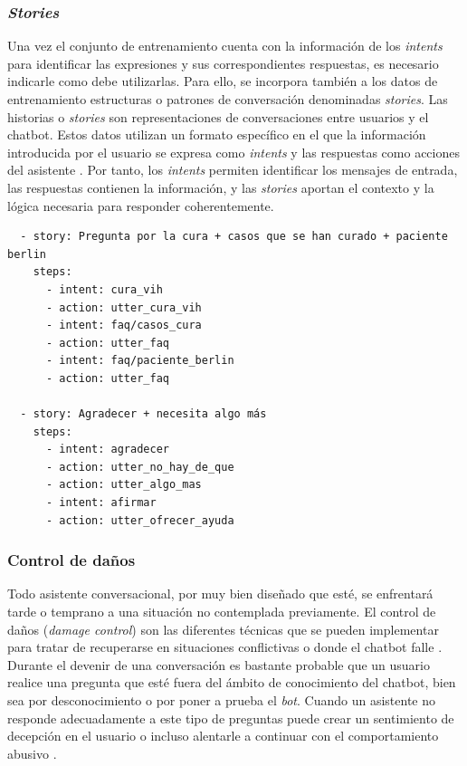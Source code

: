 \subsubsection{\textit{Stories}}
Una vez el conjunto de entrenamiento cuenta con la información de los \textit{intents} para identificar las expresiones y sus correspondientes respuestas, es necesario indicarle como debe utilizarlas. Para ello, se incorpora también a los datos de entrenamiento estructuras o patrones de conversación denominadas \textit{stories}. Las historias o \textit{stories} son representaciones de conversaciones entre usuarios y el chatbot. Estos datos utilizan un formato específico en el que la información introducida por el usuario se expresa como \textit{intents} y las respuestas como acciones del asistente \cite{rasaStories}. Por tanto, los \textit{intents} permiten identificar los mensajes de entrada, las respuestas contienen la información, y las \textit{stories} aportan el contexto y la lógica necesaria para responder coherentemente.\\

\begin{verbatim}
  - story: Pregunta por la cura + casos que se han curado + paciente berlin
    steps:
      - intent: cura_vih
      - action: utter_cura_vih
      - intent: faq/casos_cura
      - action: utter_faq
      - intent: faq/paciente_berlin
      - action: utter_faq

  - story: Agradecer + necesita algo más
    steps:
      - intent: agradecer
      - action: utter_no_hay_de_que
      - action: utter_algo_mas
      - intent: afirmar
      - action: utter_ofrecer_ayuda
\end{verbatim}


\subsubsection{Control de daños}
Todo asistente conversacional, por muy bien diseñado que esté, se enfrentará tarde o temprano a una situación no contemplada previamente. El control de daños (\textit{damage control}) son las diferentes técnicas que se pueden implementar para tratar de recuperarse en situaciones conflictivas o donde el chatbot falle \cite{shouldInteract}.\\%

Durante el devenir de una conversación es bastante probable que un usuario realice una pregunta que esté fuera del ámbito de conocimiento del chatbot, bien sea por desconocimiento o por poner a prueba el \textit{bot}. Cuando un asistente no responde adecuadamente a este tipo de preguntas puede crear un sentimiento de decepción en el usuario o incluso alentarle a continuar con el comportamiento abusivo \cite{shouldInteract}.\\

